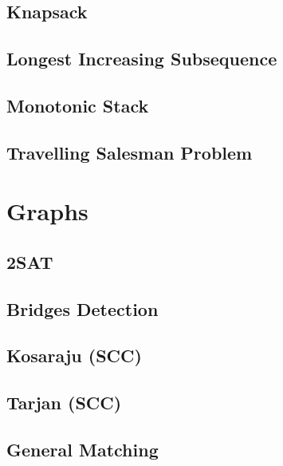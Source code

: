 \subsection{Knapsack}
\raggedbottom
\hrulefill
\subsection{Longest Increasing Subsequence}
\raggedbottom
\hrulefill
\subsection{Monotonic Stack}
\raggedbottom
\hrulefill
\subsection{Travelling Salesman Problem}
\raggedbottom
\hrulefill
\newpage

\section{Graphs}
\subsection{2SAT}
\raggedbottom
\hrulefill
\subsection{Bridges Detection}
\raggedbottom
\hrulefill
\subsection{Kosaraju (SCC)}
\raggedbottom
\hrulefill
\subsection{Tarjan (SCC)}
\raggedbottom
\hrulefill
\subsection{General Matching}
\raggedbottom
\hrulefill
